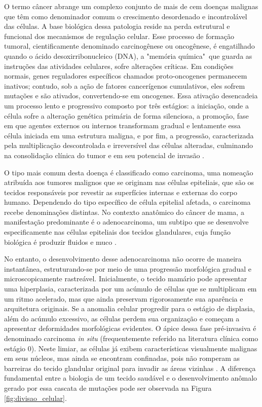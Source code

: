 \documentclass[
    12pt
    ,oneside
    ,a4paper
    ,chapter=TITLE
    ,section=TITLE
    ,sumario=abnt-6027-2012
    ,english,brazil]{abntex2} %
\begin{document}
O termo câncer abrange um complexo conjunto de mais de cem doenças malignas que têm como denominador comum o crescimento desordenado e incontrolável das células. A base biológica dessa patologia reside na perda estrutural e funcional dos mecanismos de regulação celular. Esse processo de formação tumoral, cientificamente denominado carcinogênese ou oncogênese, é engatilhado quando o ácido desoxirribonucleico (DNA), a "memória química"\ que guarda as instruções das atividades celulares, sofre alterações críticas. Em condições normais, genes reguladores específicos chamados proto-oncogenes permanecem inativos; contudo, sob a ação de fatores cancerígenos cumulativos, eles sofrem mutações e são ativados, convertendo-se em oncogenes. Essa ativação desencadeia um processo lento e progressivo composto por três estágios: a iniciação, onde a célula sofre a alteração genética primária de forma silenciosa, a promoção, fase em que agentes externos ou internos transformam gradual e lentamente essa célula iniciada em uma estrutura maligna, e por fim, a progressão, caracterizada pela multiplicação descontrolada e irreversível das células alteradas, culminando na consolidação clínica do tumor e em seu potencial de invasão \cite{Inca-como-surge-cancer}.

O tipo mais comum desta doença é classificado como carcinoma, uma nomeação atribuída aos tumores malignos que se originam nas células epiteliais, que são os tecidos responsáveis por revestir as superfícies internas e externas do corpo humano. Dependendo do tipo específico de célula epitelial afetada, o carcinoma recebe denominações distintas. No contexto anatômico do câncer de mama, a manifestação predominante é o adenocarcinoma, um subtipo que se desenvolve especificamente nas células epiteliais dos tecidos glandulares, cuja função biológica é produzir fluidos e muco \cite{Nci-what-is-cancer}.

No entanto, o desenvolvimento desse adenocarcinoma não ocorre de maneira instantânea, estruturando-se por meio de uma progressão morfológica gradual e microscopicamente rastreável. Inicialmente, o tecido mamário pode apresentar uma hiperplasia, caracterizada por um acúmulo de células que se multiplicam em um ritmo acelerado, mas que ainda preservam rigorosamente sua aparência e arquitetura originais. Se a anomalia celular progredir para o estágio de displasia, além do acúmulo excessivo, as células perdem sua organização e começam a apresentar deformidades morfológicas evidentes. O ápice dessa fase pré-invasiva é denominado carcinoma \textit{in situ} (frequentemente referido na literatura clínica como estágio 0). Neste limiar, as células já exibem características visualmente malignas em seus núcleos, mas ainda se encontram confinadas, pois não romperam as barreiras do tecido glandular original para invadir as áreas vizinhas \cite{Nci-what-is-cancer}. A diferença fundamental entre a biologia de um tecido saudável e o desenvolvimento anômalo gerado por essa cascata de mutações pode ser observada na Figura \ref{fig:divisao_celular}.
\end{document}
